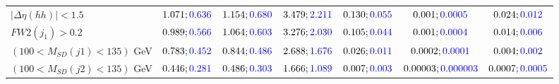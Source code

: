 \begin{landscape}
\begin{table}
\begin{tabular}{lcccccc}
				\rowcolor{black!7}$|\Delta\eta(hh)|<1.5$& $1.071;\textcolor{blue}{0.636}$&$1.154;\textcolor{blue}{0.680}$ &$3.479;\textcolor{blue}{2.211}$ &$0.130;\textcolor{blue}{0.055}$ &$0.001;\textcolor{blue}{0.0005}$ &$0.024;\textcolor{blue}{0.012}$\\
				$FW2(j_1)>0.2$ &$0.989;\textcolor{blue}{0.566}$ &$1.064;\textcolor{blue}{0.603}$&$3.276;\textcolor{blue}{2.030}$&$0.105;\textcolor{blue}{0.044}$&$0.001;\textcolor{blue}{0.0004}$&$0.014;\textcolor{blue}{0.006}$\\
				\rowcolor{black!7}$(100<M_{SD}(j1)<135)$ GeV& $0.783;\textcolor{blue}{0.452}$&$0.844;\textcolor{blue}{0.486}$&$2.688;\textcolor{blue}{1.676}$&$0.026;\textcolor{blue}{0.011}$&$0.0002;\textcolor{blue}{0.0001}$&$0.004;\textcolor{blue}{0.002}$\\
				$(100<M_{SD}(j2)<135)$ GeV &$0.446;\textcolor{blue}{0.281}$ &$0.486;\textcolor{blue}{0.303}$ &$1.666;\textcolor{blue}{1.089}$&$0.007;\textcolor{blue}{0.003}$&$0.00003;\textcolor{blue}{0.000003}$&$0.0007;\textcolor{blue}{0.0005}$\\
				\bottomrule
			\end{tabular}
		\end{table}
		

\end{landscape}

